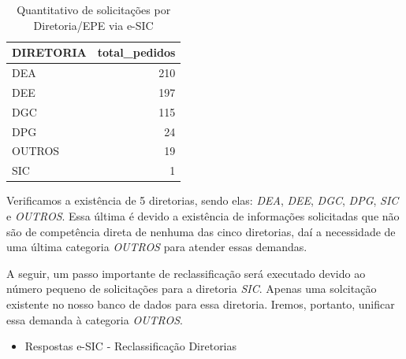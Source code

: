 \documentclass[]{article}
\newenvironment{Shaded}{\begin{snugshade}}{\end{snugshade}}
\newcommand{\KeywordTok}[1]{\textcolor[rgb]{0.13,0.29,0.53}{\textbf{#1}}}
\newcommand{\DataTypeTok}[1]{\textcolor[rgb]{0.13,0.29,0.53}{#1}}
\newcommand{\DecValTok}[1]{\textcolor[rgb]{0.00,0.00,0.81}{#1}}
\newcommand{\StringTok}[1]{\textcolor[rgb]{0.31,0.60,0.02}{#1}}
\newcommand{\CommentTok}[1]{\textcolor[rgb]{0.56,0.35,0.01}{\textit{#1}}}
\newcommand{\OperatorTok}[1]{\textcolor[rgb]{0.81,0.36,0.00}{\textbf{#1}}}
\newcommand{\NormalTok}[1]{#1}
\providecommand{\tightlist}{%
  \setlength{\itemsep}{0pt}\setlength{\parskip}{0pt}}
\begin{document}
\begin{table}[!h]

\caption{\label{tab:unnamed-chunk-13}Quantitativo de solicitações por Diretoria/EPE via e-SIC}
\centering
\begin{tabular}{lr}
\toprule
DIRETORIA & total\_pedidos\\
\midrule
\rowcolor{gray!6}  DEA & 210\\
DEE & 197\\
\rowcolor{gray!6}  DGC & 115\\
DPG & 24\\
\rowcolor{gray!6}  OUTROS & 19\\
\addlinespace
SIC & 1\\
\bottomrule
\end{tabular}
\end{table}

\begin{Shaded}
\end{Shaded}

Verificamos a existência de 5 diretorias, sendo elas: \emph{DEA},
\emph{DEE}, \emph{DGC}, \emph{DPG}, \emph{SIC} e \emph{OUTROS}. Essa
última é devido a existência de informações solicitadas que não são de
competência direta de nenhuma das cinco diretorias, daí a necessidade de
uma última categoria \emph{OUTROS} para atender essas demandas.

A seguir, um passo importante de reclassificação será executado devido
ao número pequeno de solicitações para a diretoria \emph{SIC}. Apenas
uma solcitação existente no nosso banco de dados para essa diretoria.
Iremos, portanto, unificar essa demanda à categoria \emph{OUTROS}.

\begin{itemize}
\tightlist
\item
  Respostas e-SIC - Reclassificação Diretorias
\end{itemize}

\begin{Shaded}
\end{Shaded}
\end{document}
